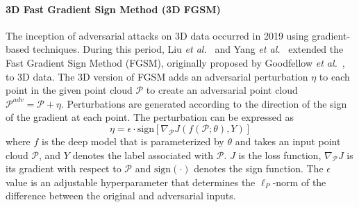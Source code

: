 \documentclass{ieeeaccess}
\def\etal{\textit{et al.}}
\newcommand{\sign}{\text{sign}}
\begin{document}
\paragraph{3D Fast Gradient Sign Method (3D FGSM)}
\label{subsubsubsec:FGSM}

The inception of adversarial attacks on 3D data occurred in 2019 using gradient-based techniques. During this period, Liu \etal~\cite{liu2019extending} and Yang \etal~\cite{yang2019adversarial} extended the Fast Gradient Sign Method (FGSM), originally proposed by Goodfellow \etal~\cite{goodfellow2015explaining}, to 3D data. The 3D version of FGSM adds an adversarial perturbation $\eta$ to each point in the given point cloud $\mathcal{P}$ to create an adversarial point cloud  $\mathcal{P}^{adv} = \mathcal{P}+\eta$. Perturbations are generated according to the direction of the sign of the gradient at each point. %
The perturbation can be expressed as
\begin{equation}
\eta = \epsilon \cdot \sign\left[\nabla_\mathcal{P}J(f(\mathcal{P};\theta),Y)\right]
\label{eq:11}
\end{equation}
where $f$ is the deep model that is parameterized by $\theta$ and takes an input point cloud $\mathcal{P}$, and $Y$ denotes the label associated with $\mathcal{P}$. $J$ is the loss function,  $\nabla_\mathcal{P}J$ is its gradient with respect to $\mathcal{P}$ and $\sign(\cdot)$ denotes the sign function. The $\epsilon$ value is an adjustable hyperparameter that determines the $\ell_P$-norm of the difference between the original and adversarial inputs.%




\end{document}
